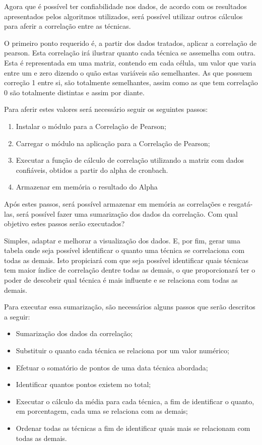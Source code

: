 Agora que é possível ter confiabilidade nos dados, de acordo com os resultados apresentados pelos algoritmos utilizados, será
possível
utilizar outros cálculos para aferir a correlação entre as técnicas.

O primeiro ponto requerido é, a partir dos dados tratados, aplicar a correlação de pearson. Esta correlação irá ilustrar
quanto cada técnica se assemelha com outra. Esta é representada em uma matriz, contendo em cada célula, um valor que varia entre um
e zero dizendo o quão estas variáveis são semelhantes. As que possuem correção 1 entre si, são totalmente semelhantes, assim como as que tem
correlação 0 são totalmente distintas e assim por diante.

Para aferir estes valores será necessário seguir os seguintes passos:

\begin{enumerate}
    \item Instalar o módulo para a Correlação de Pearson;
    \item Carregar o módulo  na aplicação para a Correlação de Pearson;
    \item Executar a função de cálculo de correlação utilizando a matriz com dados confiáveis, obtidos a partir do alpha de cronbach.
    \item Armazenar em memória o resultado do Alpha
\end{enumerate}

Após estes passos, será possível armazenar em memória as correlações e resgatá-las, será possível fazer uma sumarização dos dados
da correlação. Com qual objetivo estes passos serão executados?

Simples, adaptar e melhorar a visualização dos dados. E, por fim, gerar uma tabela onde seja possível identificar o quanto uma técnica
se correlaciona com todas as demais. Isto propiciará com que seja possível identificar quais técnicas tem maior índice de correlação
dentre todas as demais, o que proporcionará ter o poder de descobrir qual técnica é mais influente e se relaciona com todas as demais.


Para executar essa sumarização, são necessários alguns passos que serão descritos a seguir:

\begin{itemize}
    \item Sumarização dos dados da correlação;
    \item Substituir o quanto cada técnica se relaciona por um valor numérico;
    \item Efetuar o somatório de pontos de uma data técnica abordada;
    \item Identificar quantos pontos existem no total;
    \item Executar o cálculo da média para cada técnica, a fim de identificar o quanto, em porcentagem, cada uma
        se relaciona com as demais;
    \item Ordenar todas as técnicas a fim de identificar quais mais se relacionam com todas as demais.
\end{itemize}

